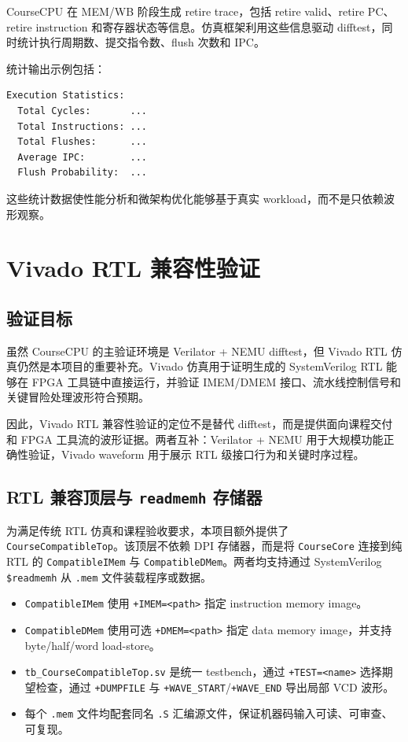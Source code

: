 \documentclass[UTF8,a4paper,12pt]{ctexrep}
\begin{document}
CourseCPU 在 MEM/WB 阶段生成 retire trace，包括 retire valid、retire PC、retire instruction 和寄存器状态等信息。仿真框架利用这些信息驱动 difftest，同时统计执行周期数、提交指令数、flush 次数和 IPC。

统计输出示例包括：

\begin{lstlisting}[language={}]
Execution Statistics:
  Total Cycles:       ...
  Total Instructions: ...
  Total Flushes:      ...
  Average IPC:        ...
  Flush Probability:  ...
\end{lstlisting}

这些统计数据使性能分析和微架构优化能够基于真实 workload，而不是只依赖波形观察。

\chapter{Vivado RTL 兼容性验证}

\section{验证目标}

虽然 CourseCPU 的主验证环境是 Verilator + NEMU difftest，但 Vivado RTL 仿真仍然是本项目的重要补充。Vivado 仿真用于证明生成的 SystemVerilog RTL 能够在 FPGA 工具链中直接运行，并验证 IMEM/DMEM 接口、流水线控制信号和关键冒险处理波形符合预期。

因此，Vivado RTL 兼容性验证的定位不是替代 difftest，而是提供面向课程交付和 FPGA 工具流的波形证据。两者互补：Verilator + NEMU 用于大规模功能正确性验证，Vivado waveform 用于展示 RTL 级接口行为和关键时序过程。

\section{RTL 兼容顶层与 \texttt{readmemh} 存储器}

为满足传统 RTL 仿真和课程验收要求，本项目额外提供了 \texttt{CourseCompatibleTop}。该顶层不依赖 DPI 存储器，而是将 \texttt{CourseCore} 连接到纯 RTL 的 \texttt{CompatibleIMem} 与 \texttt{CompatibleDMem}。两者均支持通过 SystemVerilog \texttt{\$readmemh} 从 \texttt{.mem} 文件装载程序或数据。

\begin{itemize}
  \item \texttt{CompatibleIMem} 使用 \texttt{+IMEM=<path>} 指定 instruction memory image。
  \item \texttt{CompatibleDMem} 使用可选 \texttt{+DMEM=<path>} 指定 data memory image，并支持 byte/half/word load-store。
  \item \texttt{tb\_CourseCompatibleTop.sv} 是统一 testbench，通过 \texttt{+TEST=<name>} 选择期望检查，通过 \texttt{+DUMPFILE} 与 \texttt{+WAVE\_START}/\texttt{+WAVE\_END} 导出局部 VCD 波形。
  \item 每个 \texttt{.mem} 文件均配套同名 \texttt{.S} 汇编源文件，保证机器码输入可读、可审查、可复现。
\end{itemize}
\end{document}
